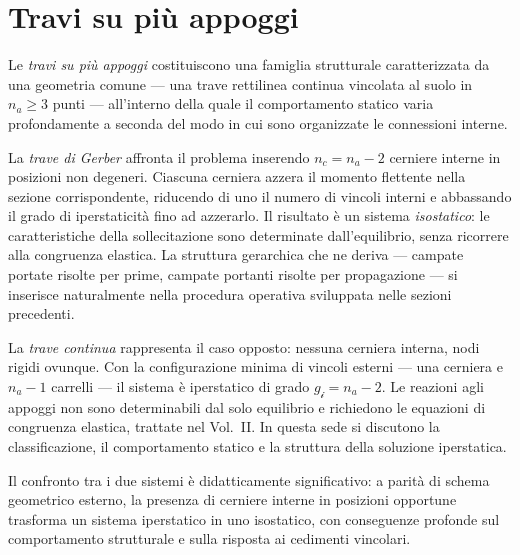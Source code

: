 \section{Travi su più appoggi}
\label{sec:travi_piu_appoggi}

Le \emph{travi su più appoggi} costituiscono una famiglia strutturale
caratterizzata da una geometria comune --- una trave rettilinea
continua vincolata al suolo in $n_a \geq 3$ punti --- all'interno
della quale il comportamento statico varia profondamente a seconda
del modo in cui sono organizzate le connessioni interne.

La \emph{trave di Gerber} affronta il problema inserendo
$n_c = n_a - 2$ cerniere interne in posizioni non degeneri.
Ciascuna cerniera azzera il momento flettente nella sezione
corrispondente, riducendo di uno il numero di vincoli interni
e abbassando il grado di iperstaticità fino ad azzerarlo.
Il risultato è un sistema \emph{isostatico}: le caratteristiche
della sollecitazione sono determinate dall'equilibrio, senza
ricorrere alla congruenza elastica. La struttura gerarchica
che ne deriva --- campate portate risolte per prime, campate
portanti risolte per propagazione --- si inserisce naturalmente
nella procedura operativa sviluppata nelle sezioni precedenti.

La \emph{trave continua} rappresenta il caso opposto: nessuna
cerniera interna, nodi rigidi ovunque. Con la configurazione
minima di vincoli esterni --- una cerniera e $n_a - 1$ carrelli
--- il sistema è iperstatico di grado $g_{\mathscr{i}} = n_a - 2$.
Le reazioni agli appoggi non sono determinabili dal solo equilibrio
e richiedono le equazioni di congruenza elastica, trattate nel
Vol.~II. In questa sede si discutono la classificazione, il
comportamento statico e la struttura della soluzione iperstatica.

Il confronto tra i due sistemi è didatticamente significativo:
a parità di schema geometrico esterno, la presenza di cerniere
interne in posizioni opportune trasforma un sistema iperstatico
in uno isostatico, con conseguenze profonde sul comportamento
strutturale e sulla risposta ai cedimenti vincolari.


